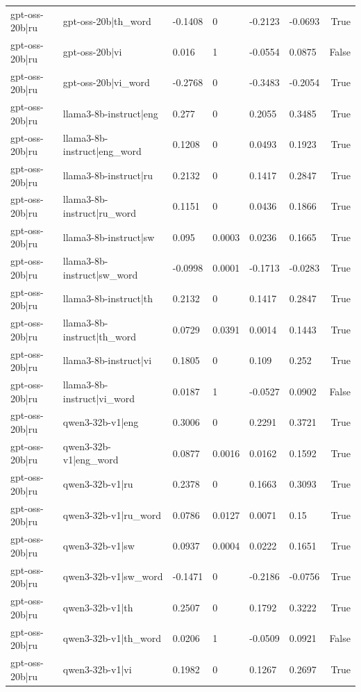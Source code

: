 \begin{table}
\begin{tabular}{llllllr}
gpt-oss-20b|ru & gpt-oss-20b|th_word & -0.1408 & 0 & -0.2123 & -0.0693 & True \\
gpt-oss-20b|ru & gpt-oss-20b|vi & 0.016 & 1 & -0.0554 & 0.0875 & False \\
gpt-oss-20b|ru & gpt-oss-20b|vi_word & -0.2768 & 0 & -0.3483 & -0.2054 & True \\
gpt-oss-20b|ru & llama3-8b-instruct|eng & 0.277 & 0 & 0.2055 & 0.3485 & True \\
gpt-oss-20b|ru & llama3-8b-instruct|eng_word & 0.1208 & 0 & 0.0493 & 0.1923 & True \\
gpt-oss-20b|ru & llama3-8b-instruct|ru & 0.2132 & 0 & 0.1417 & 0.2847 & True \\
gpt-oss-20b|ru & llama3-8b-instruct|ru_word & 0.1151 & 0 & 0.0436 & 0.1866 & True \\
gpt-oss-20b|ru & llama3-8b-instruct|sw & 0.095 & 0.0003 & 0.0236 & 0.1665 & True \\
gpt-oss-20b|ru & llama3-8b-instruct|sw_word & -0.0998 & 0.0001 & -0.1713 & -0.0283 & True \\
gpt-oss-20b|ru & llama3-8b-instruct|th & 0.2132 & 0 & 0.1417 & 0.2847 & True \\
gpt-oss-20b|ru & llama3-8b-instruct|th_word & 0.0729 & 0.0391 & 0.0014 & 0.1443 & True \\
gpt-oss-20b|ru & llama3-8b-instruct|vi & 0.1805 & 0 & 0.109 & 0.252 & True \\
gpt-oss-20b|ru & llama3-8b-instruct|vi_word & 0.0187 & 1 & -0.0527 & 0.0902 & False \\
gpt-oss-20b|ru & qwen3-32b-v1|eng & 0.3006 & 0 & 0.2291 & 0.3721 & True \\
gpt-oss-20b|ru & qwen3-32b-v1|eng_word & 0.0877 & 0.0016 & 0.0162 & 0.1592 & True \\
gpt-oss-20b|ru & qwen3-32b-v1|ru & 0.2378 & 0 & 0.1663 & 0.3093 & True \\
gpt-oss-20b|ru & qwen3-32b-v1|ru_word & 0.0786 & 0.0127 & 0.0071 & 0.15 & True \\
gpt-oss-20b|ru & qwen3-32b-v1|sw & 0.0937 & 0.0004 & 0.0222 & 0.1651 & True \\
gpt-oss-20b|ru & qwen3-32b-v1|sw_word & -0.1471 & 0 & -0.2186 & -0.0756 & True \\
gpt-oss-20b|ru & qwen3-32b-v1|th & 0.2507 & 0 & 0.1792 & 0.3222 & True \\
gpt-oss-20b|ru & qwen3-32b-v1|th_word & 0.0206 & 1 & -0.0509 & 0.0921 & False \\
gpt-oss-20b|ru & qwen3-32b-v1|vi & 0.1982 & 0 & 0.1267 & 0.2697 & True \\

\end{tabular}
\end{table}
